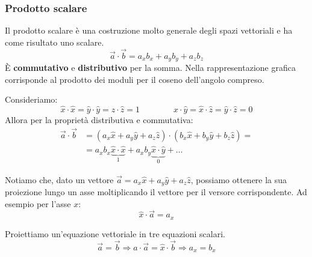 \subsubsection{Prodotto scalare}
Il prodotto scalare è una costruzione molto generale degli spazi vettoriali e ha come risultato uno scalare.
\begin{equation}
	\vec{a} \cdot \vec{b} = a_x b_x + a_y b_y +  a_z b_z
\end{equation}
È \textbf{commutativo} e \textbf{distributivo} per la somma. Nella rappresentazione grafica corrisponde al prodotto dei moduli per il coseno dell'angolo compreso.

\begin{definition}
	Consideriamo:
	\begin{equation*}
		\widehat{x} \cdot \widehat{x} = \widehat{y} \cdot \widehat{y} = \widehat{z} \cdot \widehat{z} = 1 \qquad\qquad \widehat{x} \cdot \widehat{y} = \widehat{x} \cdot \widehat{z} = \widehat{y} \cdot \widehat{z} = 0
	\end{equation*}
	Allora per la proprietà distributiva e commutativa:
	\begin{align*}
		\vec{a} \cdot \vec{b} & = (a_x \widehat{x}+ a_y \widehat{y}+ a_z\widehat{z}) \cdot ( b_x \widehat{x} + b_y \widehat{y}+b_z \widehat{z})=\\
		& = a_xb_x\underbrace{\widehat{x} \cdot \widehat{x}}_1 + a_xb_y \underbrace{\widehat{x} \cdot \widehat{y}}_0 + \ldots
	\end{align*}
\end{definition}

\begin{observation}[Proiezione]
	Notiamo che, dato un vettore $\vec{a}=a_x \widehat{x} + a_y \widehat{y} + a_z \widehat{z}$, possiamo ottenere la sua proiezione lungo un asse moltiplicando il vettore per il versore corrispondente. Ad esempio per l'asse $x$:
	\begin{equation*}
		\widehat{x} \cdot \vec{a} = a_x
	\end{equation*}
\end{observation}

\begin{observation}
	Proiettiamo un'equazione vettoriale in tre equazioni scalari.
	\begin{equation}
		\vec{a} = \vec{b} \Rightarrow \widehat{a} \cdot \vec{a} = \widehat{x} \cdot \vec{b} \Rightarrow a_x = b_x
	\end{equation}
\end{observation}


